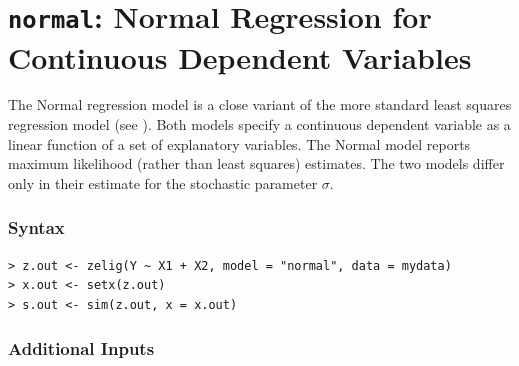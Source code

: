 \documentclass{article}
\begin{document}
\nobibliography*

\section{{\tt normal}: Normal Regression for Continuous Dependent Variables}
\label{normal}

The Normal regression model is a close variant of the more standard
least squares regression model (see ). Both models specify a
continuous dependent variable as a linear function of a set of
explanatory variables.  The Normal model reports maximum likelihood
(rather than least squares) estimates.  The two models differ only in
their estimate for the stochastic parameter $\sigma$.

\subsubsection{Syntax}

\begin{verbatim}
> z.out <- zelig(Y ~ X1 + X2, model = "normal", data = mydata)
> x.out <- setx(z.out)
> s.out <- sim(z.out, x = x.out)
\end{verbatim}

\subsubsection{Additional Inputs} 
\end{document}
